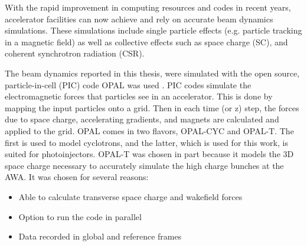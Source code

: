 \label{sec:code}


With  the  rapid  improvement  in  computing  resources  and  codes  in  recent  years,  
accelerator  facilities  can  now achieve and rely on accurate beam dynamics simulations. 
These  simulations  include  single  particle  effects  (e.g. particle tracking in a magnetic field) as well as collective effects  such  as  space  charge  (SC),  
and  coherent  synchrotron  radiation  (CSR).

The beam dynamics reported in this thesis, were simulated with 
the open source, particle-in-cell (PIC) code OPAL was used \cite{opal}. 
PIC codes simulate the electromagnetic forces that particles see in an accelerator. 
This is done by mapping the input particles onto a grid. 
Then in each time (or z) step, the forces due to space charge, accelerating gradients, 
and magnets are calculated and applied to the grid.
OPAL comes in two flavors, OPAL-CYC and OPAL-T. The first is used to model 
cyclotrons, and the latter, which is used for this work, is suited for photoinjectors. 
OPAL-T was chosen in part because it models the 3D space charge necessary to accurately simulate the high charge bunches at the AWA. 
It was chosen for several reasons:
\begin{itemize}
	\item Able to calculate transverse space charge and wakefield forces 
	\item Option to run the code in parallel
	\item Data recorded in global and reference frames
\end{itemize} 

